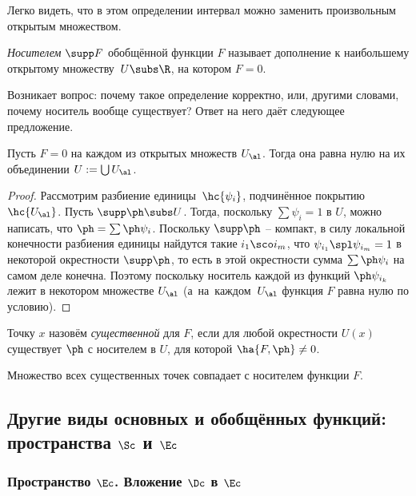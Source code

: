 \documentclass[a4paper]{article}
\begin{document}
Легко видеть, что в этом определении интервал можно заменить произвольным
открытым множеством.

\begin{df}
\emph{Носителем} $\supp F$ обобщённой функции $F$ называет дополнение к наибольшему открытому множеству~$U \subs \R$,
на котором $F = 0$.
\end{df}

Возникает вопрос: почему такое определение корректно, или, другими словами, почему носитель вообще существует?
Ответ на него даёт следующее предложение.

\begin{prop}
Пусть $F = 0$ на каждом из открытых множеств $U_\al$. Тогда она равна нулю на их объединении $U := \bigcup U_\al$.
\end{prop}
\begin{proof}
Рассмотрим разбиение единицы~$\hc{\psi_i}$, подчинённое покрытию $\hc{U_\al}$.
Пусть $\supp \ph \subs U$. Тогда, поскольку $\sum \psi_i = 1$ в $U$, можно написать,
что $\ph = \sum\ph\psi_i$. Поскольку $\supp\ph$ -- компакт, в силу локальной конечности
разбиения единицы найдутся такие $i_1\sco i_m$, что $\psi_{i_1}\spl \psi_{i_m} = 1$ в некоторой
окрестности $\supp \ph$, то есть в этой окрестности сумма $\sum\ph\psi_i$ на самом деле
конечна. Поэтому
поскольку носитель каждой из функций $\ph\psi_{i_k}$ лежит в некотором множестве $U_\al$ (а~на~каждом~$U_\al$
функция $F$ равна нулю по условию).
\end{proof}

\begin{df}
Точку $x$ назовём \emph{существенной} для $F$, если для любой окрестности $U(x)$ существует $\ph$
с носителем в $U$, для которой $\ha{F,\ph} \neq 0$.
\end{df}

\begin{problem}
Множество всех существенных точек совпадает с носителем функции $F$.
\end{problem}

\subsection{Другие виды основных и обобщённых функций: пространства $\Sc$ и $\Ec$}

\subsubsection{Пространство $\Ec$. Вложение $\Dc$ в $\Ec$}
\end{document}
